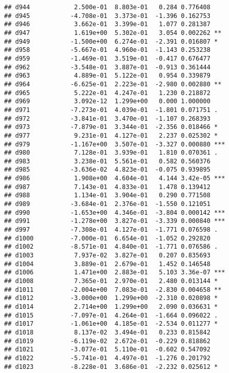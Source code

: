 \documentclass[
]{article}
\begin{document}
\begin{verbatim}
## d944            2.500e-01  8.803e-01   0.284 0.776408    
## d945           -4.708e-01  3.373e-01  -1.396 0.162753    
## d946            3.662e-01  3.399e-01   1.077 0.281387    
## d947            1.619e+00  5.302e-01   3.054 0.002262 ** 
## d949           -1.500e+00  6.274e-01  -2.391 0.016807 *  
## d958           -5.667e-01  4.960e-01  -1.143 0.253238    
## d959           -1.469e-01  3.519e-01  -0.417 0.676477    
## d962           -3.548e-01  3.887e-01  -0.913 0.361444    
## d963            4.889e-01  5.122e-01   0.954 0.339879    
## d964           -6.625e-01  2.223e-01  -2.980 0.002880 ** 
## d965            5.222e-01  4.247e-01   1.230 0.218872    
## d969            3.092e-12  1.299e+00   0.000 1.000000    
## d971           -7.273e-01  4.039e-01  -1.801 0.071751 .  
## d972           -3.841e-01  3.470e-01  -1.107 0.268393    
## d973           -7.879e-01  3.344e-01  -2.356 0.018466 *  
## d977            9.231e-01  4.127e-01   2.237 0.025302 *  
## d979           -1.167e+00  3.507e-01  -3.327 0.000880 ***
## d980            7.128e-01  3.939e-01   1.810 0.070361 .  
## d983            3.238e-01  5.561e-01   0.582 0.560376    
## d985           -3.636e-02  4.823e-01  -0.075 0.939895    
## d986            1.908e+00  4.604e-01   4.144 3.42e-05 ***
## d987            7.143e-01  4.833e-01   1.478 0.139412    
## d988            1.134e-01  3.904e-01   0.290 0.771508    
## d989           -3.684e-01  2.376e-01  -1.550 0.121051    
## d990           -1.653e+00  4.346e-01  -3.804 0.000142 ***
## d991           -1.278e+00  3.827e-01  -3.339 0.000840 ***
## d997           -7.308e-01  4.127e-01  -1.771 0.076598 .  
## d1000          -7.000e-01  6.654e-01  -1.052 0.292820    
## d1002          -8.571e-01  4.840e-01  -1.771 0.076586 .  
## d1003           7.937e-02  3.827e-01   0.207 0.835693    
## d1004           3.889e-01  2.679e-01   1.452 0.146548    
## d1006           1.471e+00  2.883e-01   5.103 3.36e-07 ***
## d1008           7.365e-01  2.970e-01   2.480 0.013144 *  
## d1011          -2.004e+00  7.083e-01  -2.830 0.004658 ** 
## d1012          -3.000e+00  1.299e+00  -2.310 0.020898 *  
## d1014           2.714e+00  1.299e+00   2.090 0.036631 *  
## d1015          -7.097e-01  4.264e-01  -1.664 0.096022 .  
## d1017          -1.061e+00  4.185e-01  -2.534 0.011277 *  
## d1018           8.137e-02  3.494e-01   0.233 0.815842    
## d1019          -6.119e-02  2.672e-01  -0.229 0.818862    
## d1021          -3.077e-01  5.110e-01  -0.602 0.547092    
## d1022          -5.741e-01  4.497e-01  -1.276 0.201792    
## d1023          -8.228e-01  3.686e-01  -2.232 0.025612 *  

\end{verbatim}
\end{document}
